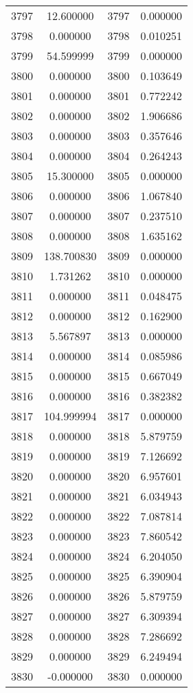 \documentclass[12pt]{article}
\begin{document}
\begin{longtable}{@{}cccc@{}}
3797 & 12.600000 & 3797 & 0.000000 \\
3798 & 0.000000 & 3798 & 0.010251 \\
3799 & 54.599999 & 3799 & 0.000000 \\
3800 & 0.000000 & 3800 & 0.103649 \\
3801 & 0.000000 & 3801 & 0.772242 \\
3802 & 0.000000 & 3802 & 1.906686 \\
3803 & 0.000000 & 3803 & 0.357646 \\
3804 & 0.000000 & 3804 & 0.264243 \\
3805 & 15.300000 & 3805 & 0.000000 \\
3806 & 0.000000 & 3806 & 1.067840 \\
3807 & 0.000000 & 3807 & 0.237510 \\
3808 & 0.000000 & 3808 & 1.635162 \\
3809 & 138.700830 & 3809 & 0.000000 \\
3810 & 1.731262 & 3810 & 0.000000 \\
3811 & 0.000000 & 3811 & 0.048475 \\
3812 & 0.000000 & 3812 & 0.162900 \\
3813 & 5.567897 & 3813 & 0.000000 \\
3814 & 0.000000 & 3814 & 0.085986 \\
3815 & 0.000000 & 3815 & 0.667049 \\
3816 & 0.000000 & 3816 & 0.382382 \\
3817 & 104.999994 & 3817 & 0.000000 \\
3818 & 0.000000 & 3818 & 5.879759 \\
3819 & 0.000000 & 3819 & 7.126692 \\
3820 & 0.000000 & 3820 & 6.957601 \\
3821 & 0.000000 & 3821 & 6.034943 \\
3822 & 0.000000 & 3822 & 7.087814 \\
3823 & 0.000000 & 3823 & 7.860542 \\
3824 & 0.000000 & 3824 & 6.204050 \\
3825 & 0.000000 & 3825 & 6.390904 \\
3826 & 0.000000 & 3826 & 5.879759 \\
3827 & 0.000000 & 3827 & 6.309394 \\
3828 & 0.000000 & 3828 & 7.286692 \\
3829 & 0.000000 & 3829 & 6.249494 \\
3830 & -0.000000 & 3830 & 0.000000 \\

\end{longtable}
\end{document}
